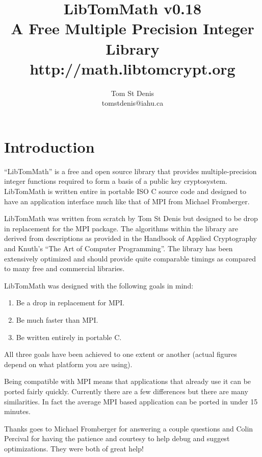 \documentclass[]{article}
\begin{document}
\title{LibTomMath v0.18 \\ A Free Multiple Precision Integer Library \\ http://math.libtomcrypt.org }
\author{Tom St Denis \\ tomstdenis@iahu.ca}
\maketitle
\newpage

\section{Introduction}
``LibTomMath'' is a free and open source library that provides multiple-precision integer functions required to form a 
basis of a public key cryptosystem.  LibTomMath is written entire in portable ISO C source code and designed to have an 
application interface much like that of MPI from Michael Fromberger.  

LibTomMath was written from scratch by Tom St Denis but designed to be  drop in replacement for the MPI package.  The 
algorithms within the library are derived from descriptions as provided in the Handbook of Applied Cryptography and Knuth's
``The Art of Computer Programming''.  The library has been extensively optimized and should provide quite comparable 
timings as compared to many free and commercial libraries.

LibTomMath was designed with the following goals in mind:
\begin{enumerate}
\item Be a drop in replacement for MPI.
\item Be much faster than MPI.
\item Be written entirely in portable C.
\end{enumerate}

All three goals have been achieved to one extent or another (actual figures depend on what platform you are using).

Being compatible with MPI means that applications that already use it can be ported fairly quickly.  Currently there are 
a few differences but there are many similarities.  In fact the average MPI based application can be ported in under 15
minutes.  

Thanks goes to Michael Fromberger for answering a couple questions and Colin Percival for having the patience and courtesy to
help debug and suggest optimizations.  They were both of great help!
\end{document}
